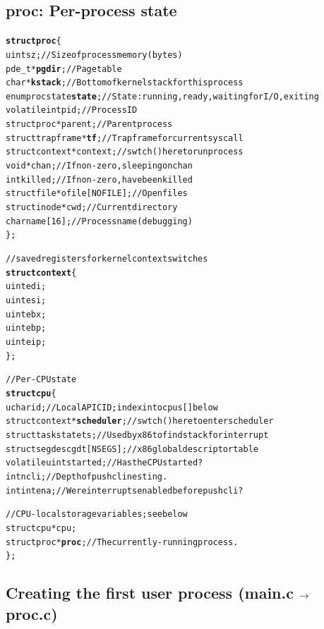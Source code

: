 \documentclass{note}
\begin{document}

\pagebreak
\subsection{proc: Per-process state}
\begin{alltt}
  \textcolor{red2}{\textbf{struct proc}} \{
    uint sz;                     // Size of process memory (bytes)
    pde_t* \textbf{pgdir};                // Page table
    char *\textbf{kstack};                // Bottom of kernel stack for this process
    enum procstate \textbf{state};        // State: running, ready, waiting for I/O, exiting
    volatile int pid;            // Process ID
    struct proc *parent;         // Parent process
    struct trapframe *\textbf{tf};        // Trap frame for current syscall
    struct context *context;     // swtch() here to run process
    void *chan;                  // If non-zero, sleeping on chan
    int killed;                  // If non-zero, have been killed
    struct file *ofile[NOFILE];  // Open files
    struct inode *cwd;           // Current directory
    char name[16];               // Process name (debugging)
  \};

  // saved registers for kernel context switches
  \textcolor{red2}{\textbf{struct context}} \{
    uint edi;
    uint esi;
    uint ebx;
    uint ebp;
    uint eip;
  \};

  // Per-CPU state
  \textcolor{red2}{\textbf{struct cpu}} \{
    uchar id;                    // Local APIC ID; index into cpus[] below
    struct context *\textbf{scheduler};   // swtch() here to enter scheduler
    struct taskstate ts;         // Used by x86 to find stack for interrupt
    struct segdesc gdt[NSEGS];   // x86 global descriptor table
    volatile uint started;       // Has the CPU started?
    int ncli;                    // Depth of pushcli nesting.
    int intena;                  // Were interrupts enabled before pushcli?
  
    // CPU-local storage variables; see below
    struct cpu *cpu;
    struct proc *\textbf{proc};           // The currently-running process.
  \};
\end{alltt}

\subsection{Creating the first user process (main.c $\mbox{$\rightarrow$}$ proc.c)}
\end{document}
